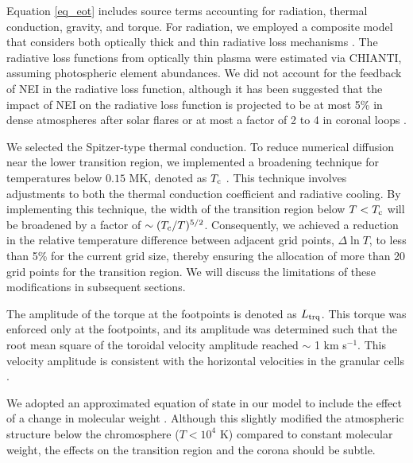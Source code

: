 \documentclass[fleqn,usenatbib]{mnras}
\begin{document}
Equation \ref{eq_eot} includes source terms accounting for radiation, thermal conduction, gravity, and torque. For radiation, we employed a composite model that considers both optically thick and thin radiative loss mechanisms \citep{2021A&A...656A.111S}. The radiative loss functions from optically thin plasma were estimated via CHIANTI, assuming photospheric element abundances. We did not account for the feedback of NEI in the radiative loss function, although it has been suggested that the impact of NEI on the radiative loss function is projected to be at most 5\% in dense atmospheres after solar flares \citep{1984SoPh...90..357M} or at most a factor of 2 to 4 in coronal loops \citep{1982ApJ...255..783M, 1993ApJ...402..741H}.

We selected the Spitzer-type thermal conduction. To reduce numerical diffusion near the lower transition region, we implemented a broadening technique for temperatures below $0.15$ MK, denoted as $T_{\rm c}$ \citep{2009ApJ...690..902L}. This technique involves adjustments to both the thermal conduction coefficient and radiative cooling. 
By implementing this technique, the width of the transition region below $T<T_{\rm c}$ will be broadened by a factor of $\sim (T_{\rm c}/T)^{5/2}$.
Consequently, we achieved a reduction in the relative temperature difference between adjacent grid points, $\Delta \ln T$, to less than 5\% for the current grid size, thereby ensuring the allocation of more than 20 grid points for the transition region. We will discuss the limitations of these modifications in subsequent sections.

The amplitude of the torque at the footpoints is denoted as $L_{\rm trq}$. This torque was enforced only at the footpoints, and its amplitude was determined such that the root mean square of the toroidal velocity amplitude reached $\sim$ 1 km s$^{-1}$. This velocity amplitude is consistent with the horizontal velocities in the granular cells \citep{1998ApJ...509..435V, 2010ApJ...716L..19M, 2012ApJ...752...48C, 2017ApJ...849....7O}.


We adopted an approximated equation of state in our model to include the effect of a change in molecular weight \citep{2014MNRAS.440..971M}. Although this slightly modified the atmospheric structure below the chromosphere ($T<10^4$ K) compared to constant molecular weight, the effects on the transition region and the corona should be subtle.
\end{document}
